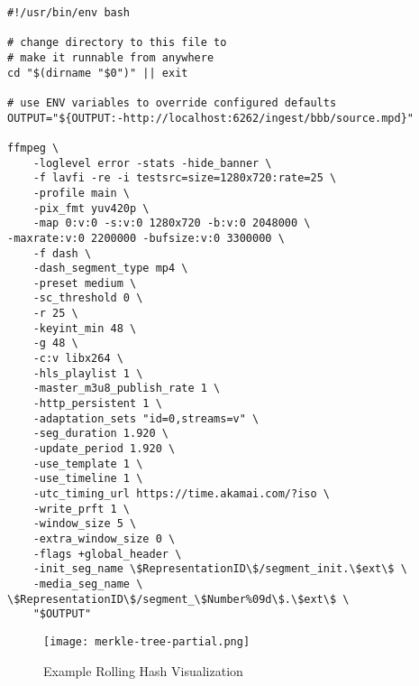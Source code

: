 
\begin{appendix}

\begin{minipage}{\linewidth}
\begin{lstlisting}[caption={Example FFmpeg Shell Script}, label=ex:shell, captionpos=b]
#!/usr/bin/env bash

# change directory to this file to  
# make it runnable from anywhere
cd "$(dirname "$0")" || exit
    
# use ENV variables to override configured defaults
OUTPUT="${OUTPUT:-http://localhost:6262/ingest/bbb/source.mpd}"
    
ffmpeg \
    -loglevel error -stats -hide_banner \
    -f lavfi -re -i testsrc=size=1280x720:rate=25 \
    -profile main \
    -pix_fmt yuv420p \
    -map 0:v:0 -s:v:0 1280x720 -b:v:0 2048000 \
-maxrate:v:0 2200000 -bufsize:v:0 3300000 \
    -f dash \
    -dash_segment_type mp4 \
    -preset medium \
    -sc_threshold 0 \
    -r 25 \
    -keyint_min 48 \
    -g 48 \
    -c:v libx264 \
    -hls_playlist 1 \
    -master_m3u8_publish_rate 1 \
    -http_persistent 1 \
    -adaptation_sets "id=0,streams=v" \
    -seg_duration 1.920 \
    -update_period 1.920 \
    -use_template 1 \
    -use_timeline 1 \
    -utc_timing_url https://time.akamai.com/?iso \
    -write_prft 1 \
    -window_size 5 \
    -extra_window_size 0 \
    -flags +global_header \
    -init_seg_name \$RepresentationID\$/segment_init.\$ext\$ \
    -media_seg_name \
\$RepresentationID\$/segment_\$Number%09d\$.\$ext\$ \
    "$OUTPUT"
\end{lstlisting}
\end{minipage}

\begin{figure}
    \texttt{[image: merkle-tree-partial.png]}
    \caption{Example Rolling Hash Visualization}
    \label{fig:incomple_mt}
\end{figure}

\end{appendix}

\endinput
